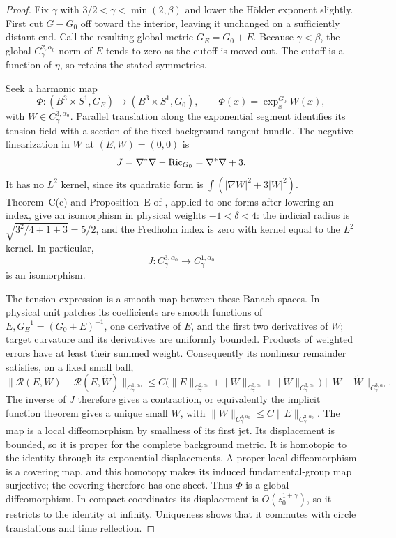 \begin{proof}
Fix $\gamma$ with $3/2<\gamma<\min(2,\beta)$ and lower the
H\"older exponent slightly.  First cut $G-G_0$ off toward the interior,
leaving it unchanged on a sufficiently distant end.  Call the
resulting global metric $G_E=G_0+E$.  Because $\gamma<\beta$, the
global $C^{2,\alpha_0}_\gamma$ norm of $E$ tends to zero as the
cutoff is moved out.  The cutoff is a function of $\eta$, so retains
the stated symmetries.

Seek a harmonic map
\[
 \Phi:(B^3\times S^1,G_E)\longrightarrow(B^3\times S^1,G_0),
 \qquad \Phi(x)=\exp^{G_0}_x W(x),
\]
with $W\in C^{3,\alpha_0}_\gamma$.  Parallel translation along
the exponential segment identifies its tension field with a section
of the fixed background tangent bundle.  The negative linearization
in $W$ at $(E,W)=(0,0)$ is
\begin{equation}
 J=\nabla^*\nabla-\operatorname{Ric}_{G_0}=\nabla^*\nabla+3.
 \label{st-map-jacobi}
\end{equation}
It has no $L^2$ kernel, since its quadratic form is
$\int(|\nabla W|^2+3|W|^2)$.  Theorem~C(c) and Proposition~E
of \cite{lee2006}, applied to one-forms after lowering an index,
give an isomorphism in physical weights $-1<\delta<4$:
the indicial radius is
$\sqrt{3^2/4+1+3}=5/2$, and the Fredholm index is zero with
kernel equal to the $L^2$ kernel.  In particular,
\[
 J:C^{3,\alpha_0}_\gamma\longrightarrow C^{1,\alpha_0}_\gamma
\]
is an isomorphism.

The tension expression is a smooth map between these Banach spaces.
In physical unit patches its coefficients are smooth functions of
$E,G_E^{-1}=(G_0+E)^{-1}$, one derivative of $E$, and the first two derivatives of
$W$; target curvature and its derivatives are uniformly bounded.
Products of weighted errors have at least their summed weight.
Consequently its nonlinear remainder satisfies, on a fixed small
ball,
\[
 \|\mathcal R(E,W)-\mathcal R(E,\widetilde W)\|_{C^{1,\alpha_0}_\gamma}
 \leq C\bigl(\|E\|_{C^{2,\alpha_0}_\gamma}
       +\|W\|_{C^{3,\alpha_0}_\gamma}
       +\|\widetilde W\|_{C^{3,\alpha_0}_\gamma}\bigr)
       \|W-\widetilde W\|_{C^{3,\alpha_0}_\gamma}.
\]
The inverse of $J$ therefore gives a contraction, or equivalently
the implicit function theorem gives a unique small $W$, with
$\|W\|_{C^{3,\alpha_0}_\gamma}\leq C\|E\|_{C^{2,\alpha_0}_\gamma}$.
The map is a local diffeomorphism by smallness of its first jet.  Its
displacement is bounded, so it is proper for the complete background
metric.  It is homotopic to the identity through its exponential
displacements.  A proper local diffeomorphism is a covering map, and
this homotopy makes its induced fundamental-group map surjective;
the covering therefore has one sheet.  Thus $\Phi$ is a global
diffeomorphism.  In compact coordinates its displacement is
$O(z_0^{1+\gamma})$, so it restricts to the identity at infinity.
Uniqueness shows that it commutes with circle translations and time
reflection.


\end{proof}
